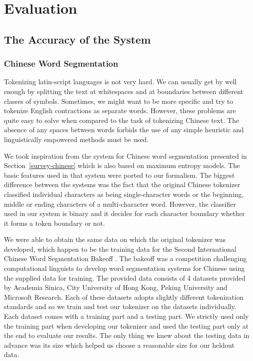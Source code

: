 \chapter{Evaluation}
\label{chap:eval}



\section{The Accuracy of the System}
\label{sec:eval-acc}

\subsection{Chinese Word Segmentation}
\label{ssec:eval-acc-chinese}

Tokenizing latin-script languages is not very hard. We can usually get by well
enough by splitting the text at whitespaces and at boundaries between different
classes of symbols. Sometimes, we might want to be more specific and try to
tokenize English contractions as separate words. However, these problems are
quite easy to solve when compared to the task of tokenizing Chinese text. The
absence of any spaces between words forbids the use of any simple heuristic and
linguistically empowered methods must be used.

We took inspiration from the system for Chinese word segmentation presented in
Section~\ref{survey-chinese} \cite{seg-chinese-maxent} which is also based on
maximum entropy models. The basic features used in that system were ported to
our formalism. The biggest difference between the systems was the fact that the
original Chinese tokenizer classified individual characters as being
single-character words or the beginning, middle or ending characters of a
multi-character word. However, the classifier used in our system is binary and
it decides for each character boundary whether it forms a token boundary or
not.

We were able to obtain the same data on which the original tokenizer was
developed, which happen to be the training data for the Second International
Chinese Word Segmentation Bakeoff \cite{web-bakeoff}. The bakeoff was a
competition challenging computational linguists to develop word segmentation
systems for Chinese using the supplied data for training. The provided data
consists of 4 datasets provided by Academia Sinica, City University of Hong
Kong, Peking University and Microsoft Research. Each of these datasets adopts
slightly different tokenization standards and so we train and test our
tokenizer on the datasets individually. Each dataset comes with a training part
and a testing part. We strictly used only the training part when developing our
tokenizer and used the testing part only at the end to evaluate our results.
The only thing we knew about the testing data in advance was its size which
helped us choose a reasonable size for our heldout data.

